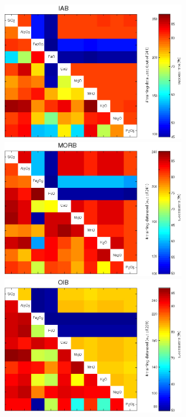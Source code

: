 \begin{figure}[htbp]
  \centering
  \includegraphics[width=300]{figures/xPlotMajor3Ti_quadratic_IAB.jpg}
  \includegraphics[width=300]{figures/xPlotMajor3Ti_quadratic_MORB.jpg}\\
  \includegraphics[width=300]{figures/xPlotMajor3Ti_quadratic_OIB.jpg}

\end{figure}
